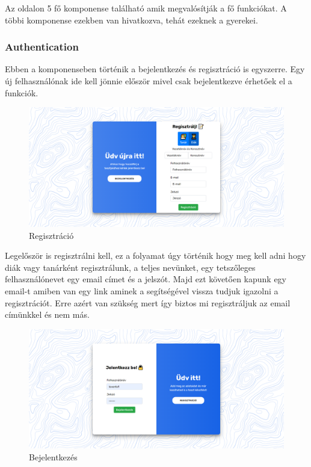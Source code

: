 Az oldalon 5 fő komponense található amik megvalósítják a fő funkciókat. A többi komponense ezekben van hivatkozva, tehát ezeknek a gyerekei.

\subsubsection{Authentication}

Ebben a komponenseben történik a bejelentkezés és regisztráció is egyszerre. Egy új felhasználónak ide kell jönnie először mivel csak bejelentkezve érhetőek el a funkciók.


\begin{figure}[H]
    \centering
    \includegraphics[width=\linewidth]{images/signin.png}
    \caption{Regisztráció}
\end{figure}


Legelőször is regisztrálni kell, ez a folyamat úgy történik hogy meg kell adni hogy diák vagy tanárként regisztrálunk, a teljes nevünket, egy tetszőleges felhasználónevet egy email címet és a jelszót. Majd ezt követően kapunk egy email-t amiben van egy link aminek a segítségével vissza tudjuk igazolni a regisztrációt. Erre azért van szükség mert így biztos mi regisztráljuk az email címünkkel és nem más.

\begin{figure}[H]
    \centering
    \includegraphics[width=\linewidth]{images/login.png}
    \caption{Bejelentkezés}
\end{figure}

